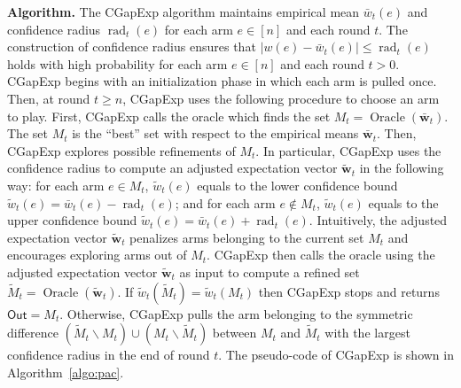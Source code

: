 \documentclass{article}
\newcommand{\Algorithm}{{\small \textsf{CGapExp}}\xspace}
\newcommand{\del}{\backslash}
\DeclareMathOperator{\rad}{rad}
\DeclareMathOperator{\Oracle}{Oracle}
\newcommand{\out}{\mathsf{Out}}
\renewcommand{\vec}[1]{\boldsymbol{#1}}
\begin{document}
\textbf{Algorithm.} 
%
The \Algorithm algorithm maintains empirical mean $\bar w_t(e)$ and confidence radius $\rad_t(e)$ for each arm $e\in[n]$ and each round $t$.
The construction of confidence radius ensures that $|w(e)-\bar w_t(e)| \le \rad_t(e)$ holds with high probability for each arm $e \in [n]$ and each round $t>0$.
\Algorithm begins with an initialization phase in which each arm is pulled once.
Then, at round $t \ge n$, \Algorithm uses the following procedure to choose an arm to play. 
First, \Algorithm calls the oracle which finds the set $M_t=\Oracle(\vec {\bar w}_t)$. 
The set $M_t$ is the ``best'' set with respect to the empirical means $\vec {\bar w}_t$.
Then, \Algorithm explores possible refinements of $M_t$. 
In particular, \Algorithm uses the confidence radius to compute an adjusted expectation vector $\vec {\tilde w}_t$ in the following way: for each arm $e \in M_t$, $\tilde w_t(e)$ equals to the lower confidence bound $\tilde w_t(e) = \bar w_t(e)-\rad_t(e)$; and for each arm $e\not\in M_t$, $\tilde w_t(e)$ equals to the upper confidence bound $\tilde w_t(e)=\bar w_t(e)+\rad_t(e)$.
Intuitively, the adjusted expectation vector $\vec {\tilde w}_t$ penalizes arms belonging to the current set $M_t$ and encourages exploring arms out of $M_t$.
\Algorithm then calls the oracle using the adjusted expectation vector $\vec {\tilde w}_t$ as input to compute a refined set $\tilde M_t = \Oracle(\vec {\tilde w}_t)$.
If $\tilde w_t(\tilde M_t) = \tilde w_t(M_t)$ then \Algorithm stops and returns $\out=M_t$.
Otherwise, \Algorithm pulls the arm belonging to the symmetric difference $(\tilde M_t \del M_t) \cup (M_t \del \tilde M_t)$ between $M_t$ and $\tilde M_t$ with the largest confidence radius in the end of round $t$.
The pseudo-code of \Algorithm is shown in Algorithm~\ref{algo:pac}. 
\end{document}
